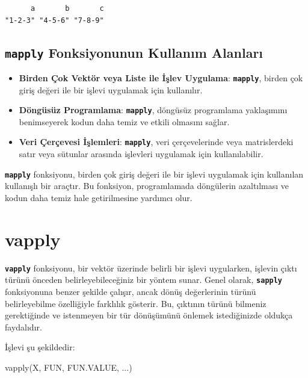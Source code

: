 \documentclass[
  letterpaper,
  DIV=11,
  numbers=noendperiod]{scrreprt}
\newenvironment{Shaded}{\begin{snugshade}}{\end{snugshade}}
\newcommand{\FunctionTok}[1]{\textcolor[rgb]{0.28,0.35,0.67}{#1}}
\newcommand{\NormalTok}[1]{\textcolor[rgb]{0.00,0.23,0.31}{#1}}
\begin{document}
\begin{verbatim}
      a       b       c 
"1-2-3" "4-5-6" "7-8-9" 
\end{verbatim}

\subsection{\texorpdfstring{\textbf{\texttt{mapply} Fonksiyonunun
Kullanım
Alanları}}{mapply Fonksiyonunun Kullanım Alanları}}\label{mapply-fonksiyonunun-kullanux131m-alanlarux131}

\begin{itemize}
\item
  \textbf{Birden Çok Vektör veya Liste ile İşlev Uygulama}:
  \textbf{\texttt{mapply}}, birden çok giriş değeri ile bir işlevi
  uygulamak için kullanılır.
\item
  \textbf{Döngüsüz Programlama}: \textbf{\texttt{mapply}}, döngüsüz
  programlama yaklaşımını benimseyerek kodun daha temiz ve etkili
  olmasını sağlar.
\item
  \textbf{Veri Çerçevesi İşlemleri}: \textbf{\texttt{mapply}}, veri
  çerçevelerinde veya matrislerdeki satır veya sütunlar arasında
  işlevleri uygulamak için kullanılabilir.
\end{itemize}

\textbf{\texttt{mapply}} fonksiyonu, birden çok giriş değeri ile bir
işlevi uygulamak için kullanılan kullanışlı bir araçtır. Bu fonksiyon,
programlamada döngülerin azaltılması ve kodun daha temiz hale
getirilmesine yardımcı olur.

\section{vapply}\label{vapply}

\textbf{\texttt{vapply}} fonksiyonu, bir vektör üzerinde belirli bir
işlevi uygularken, işlevin çıktı türünü önceden belirleyebileceğiniz bir
yöntem sunar. Genel olarak, \textbf{\texttt{sapply}} fonksiyonuna benzer
şekilde çalışır, ancak dönüş değerlerinin türünü belirleyebilme
özelliğiyle farklılık gösterir. Bu, çıktının türünü bilmeniz
gerektiğinde ve istenmeyen bir tür dönüşümünü önlemek istediğinizde
oldukça faydalıdır.

İşlevi şu şekildedir:

\begin{Shaded}
\begin{Highlighting}[]
\FunctionTok{vapply}\NormalTok{(X, FUN, FUN.VALUE, ...)}
\end{Highlighting}
\end{Shaded}
\end{document}
